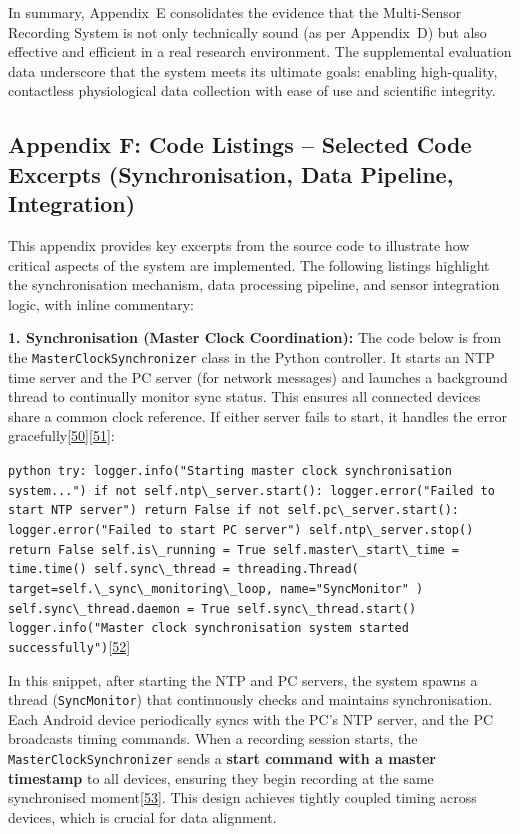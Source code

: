 \documentclass[12pt,a4paper]{article}
\begin{document}
In summary, Appendix~E consolidates the evidence that the Multi-Sensor Recording System is not only technically sound (as per Appendix~D) but also effective and efficient in a real research environment. The supplemental evaluation data underscore that the system meets its ultimate goals: enabling high-quality, contactless physiological data collection with ease of use and scientific integrity.

\subsection{Appendix F: Code Listings -- Selected Code Excerpts (Synchronisation, Data Pipeline, Integration)}\label{appendix-f-code-listings-selected-code-excerpts-synchronisation-data-pipeline-integration}

This appendix provides key excerpts from the source code to illustrate how critical aspects of the system are implemented. The following listings highlight the synchronisation mechanism, data processing pipeline, and sensor integration logic, with inline commentary:

\textbf{1. Synchronisation (Master Clock Coordination):} The code below is from the \passthrough{\lstinline!MasterClockSynchronizer!} class in the Python controller. It starts an NTP time server and the PC server (for network messages) and launches a background thread to continually monitor sync status. This ensures all connected devices share a common clock reference. If either server fails to start, it handles the error gracefully\href{PythonApp/master_clock_synchronizer.py\#L86-L94}{{[}50{]}}\href{PythonApp/master_clock_synchronizer.py\#L95-L102}{{[}51{]}}:

\passthrough{\lstinline!python try: logger.info("Starting master clock synchronisation system...") if not self.ntp\_server.start(): logger.error("Failed to start NTP server") return False if not self.pc\_server.start(): logger.error("Failed to start PC server") self.ntp\_server.stop() return False self.is\_running = True self.master\_start\_time = time.time() self.sync\_thread = threading.Thread( target=self.\_sync\_monitoring\_loop, name="SyncMonitor" ) self.sync\_thread.daemon = True self.sync\_thread.start() logger.info("Master clock synchronisation system started successfully")!}\href{PythonApp/master_clock_synchronizer.py\#L86-L102}{{[}52{]}}

In this snippet, after starting the NTP and PC servers, the system spawns a thread (\passthrough{\lstinline!SyncMonitor!}) that continuously checks and maintains synchronisation. Each Android device periodically syncs with the PC's NTP server, and the PC broadcasts timing commands. When a recording session starts, the \passthrough{\lstinline!MasterClockSynchronizer!} sends a \textbf{start command with a master timestamp} to all devices, ensuring they begin recording at the same synchronised moment\href{PythonApp/master_clock_synchronizer.py\#L164-L172}{{[}53{]}}. This design achieves tightly coupled timing across devices, which is crucial for data alignment.
\end{document}
